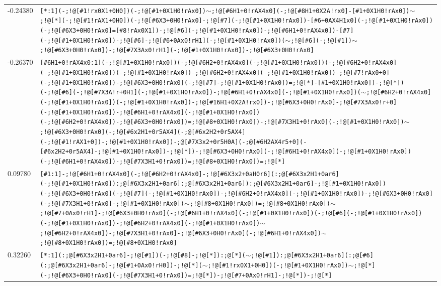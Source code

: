 \begin{longtable}{>{\baselineskip=10pt}p{} >{\baselineskip=10pt}p{}}
-0.24380 & \texttt{[*:1](-;!@[\#1!rx0X1+0H0])(-;!@[\#1+0X1H0!rAx0])$\sim$;!@[\#6H1+0!rAX4x0](-;!@[\#8H1+0X2A!rx0]-[\#1+0X1H0!rAx0])$\sim$;!@[*](-;!@[\#1!rAX1+0H0])(-;!@[\#6X3+0H0!rAx0]-;!@[\#7](-;!@[\#1+0X1H0!rAx0])-[\#6+0AX4H1x0](-;!@[\#1+0X1H0!rAx0])(-;!@[\#6X3+0H0!rAx0]=[\#8!rAx0X1])-;!@[\#6](-;!@[\#1+0X1H0!rAx0])-;!@[\#6H1+0!rAX4x0])-[\#7](-;!@[\#1+0X1H0!rAx0])-;!@[\#6]-;!@[\#6+0Ax0!rH1](-;!@[\#1+0X1H0!rAx0])($\sim$;!@[\#6](-;!@[\#1])$\sim$;!@[\#6X3+0H0!rAx0])-;!@[\#7X3Ax0!rH1](-;!@[\#1+0X1H0!rAx0])-;!@[\#6X3+0H0!rAx0]} \\ 
-0.26370 & \texttt{[\#6H1+0!rAX4x0:1](-;!@[\#1+0X1H0!rAx0])(-;!@[\#6H2+0!rAX4x0](-;!@[\#1+0X1H0!rAx0])(-;!@[\#6H2+0!rAX4x0](-;!@[\#1+0X1H0!rAx0])(-;!@[\#1+0X1H0!rAx0])-;!@[\#6H2+0!rAX4x0](-;!@[\#1+0X1H0!rAx0])-;!@[\#7!rAx0+0](-;!@[\#1+0X1H0!rAx0])-;!@[\#6X3+0H0!rAx0](-;!@[\#7]-;!@[\#1+0X1H0!rAx0])=;!@[*]-[\#1+0X1H0!rAx0])-;!@[*])(-;!@[\#6](-;!@[\#7X3A!r+0H1](-;!@[\#1+0X1H0!rAx0])-;!@[\#6H1+0!rAX4x0](-;!@[\#1+0X1H0!rAx0])($\sim$;!@[\#6H2+0!rAX4x0](-;!@[\#1+0X1H0!rAx0])(-;!@[\#1+0X1H0!rAx0])-;!@[\#16H1+0X2A!rx0])-;!@[\#6X3+0H0!rAx0]-;!@[\#7X3Ax0!r+0](-;!@[\#1+0X1H0!rAx0])-;!@[\#6H1+0!rAX4x0](-;!@[\#1+0X1H0!rAx0])(-;!@[\#6H2+0!rAX4x0])-;!@[\#6X3+0H0!rAx0])=;!@[\#8+0X1H0!rAx0])-;!@[\#7X3H1+0!rAx0](-;!@[\#1+0X1H0!rAx0])$\sim$;!@[\#6X3+0H0!rAx0](-;!@[\#6x2H1+0r5AX4](-;@[\#6x2H2+0r5AX4](-;!@[\#1!rAX1+0])-;!@[\#1+0X1H0!rAx0])-;@[\#7X3x2+0r5H0A](-;@[\#6H2AX4r5+0](-[\#6x2H2+0r5AX4]-;!@[\#1+0X1H0!rAx0])-;!@[*])-;!@[\#6X3+0H0!rAx0](-;!@[\#6H1+0!rAX4x0](-;!@[\#1+0X1H0!rAx0])(-;!@[\#6H1+0!rAX4x0])-;!@[\#7X3H1+0!rAx0])=;!@[\#8+0X1H0!rAx0])=;!@[*]} \\ 
0.09780 & \texttt{[\#1:1]-;!@[\#6H1+0!rAX4x0](-;!@[\#6H2+0!rAX4x0]-;!@[\#6X3x2+0aH0r6](:;@[\#6X3x2H1+0ar6](-;!@[\#1+0X1H0!rAx0]):;@[\#6X3x2H1+0ar6]:;@[\#6X3x2H1+0ar6]):;@[\#6X3x2H1+0ar6]-;!@[\#1+0X1H0!rAx0])(-;!@[\#6X3+0H0!rAx0](-;!@[\#7](-;!@[\#1+0X1H0!rAx0])-;!@[\#6H2+0!rAX4x0](-;!@[\#1+0X1H0!rAx0])-;!@[\#6X3+0H0!rAx0](-;!@[\#7X3H1+0!rAx0]-;!@[\#1+0X1H0!rAx0])$\sim$;!@[\#8+0X1H0!rAx0])=;!@[\#8+0X1H0!rAx0])$\sim$;!@[\#7+0Ax0!rH1]-;!@[\#6X3+0H0!rAx0](-;!@[\#6H1+0!rAX4x0](-;!@[\#1+0X1H0!rAx0])(-;!@[\#6](-;!@[\#1+0X1H0!rAx0])(-;!@[\#1+0X1H0!rAx0])-;!@[\#6H2+0!rAX4x0](-;!@[\#1+0X1H0!rAx0])$\sim$;!@[\#6H2+0!rAX4x0])-;!@[\#7X3H1+0!rAx0]-;!@[\#6X3+0H0!rAx0](-;!@[\#6H1+0!rAX4x0])$\sim$;!@[\#8+0X1H0!rAx0])=;!@[\#8+0X1H0!rAx0]} \\ 
0.32260 & \texttt{[*:1](:;@[\#6X3x2H1+0ar6]-;!@[\#1])(-;!@[\#8]-;!@[*]):;@[*]($\sim$;!@[\#1]):;@[\#6X3x2H1+0ar6](:;@[\#6](:;@[\#6X3x2H1+0ar6]-;!@[\#1+0Ax0!rH0])-;!@[*]($\sim$;!@[\#1!rx0X1+0H0])(-;!@[\#1+0X1H0!rAx0])$\sim$;!@[*](-;!@[\#6X3+0H0!rAx0](-;!@[\#7X3H1+0!rAx0])=;!@[*])-;!@[\#7+0Ax0!rH1]-;!@[*])-;!@[*]} \\ 

\end{longtable}
